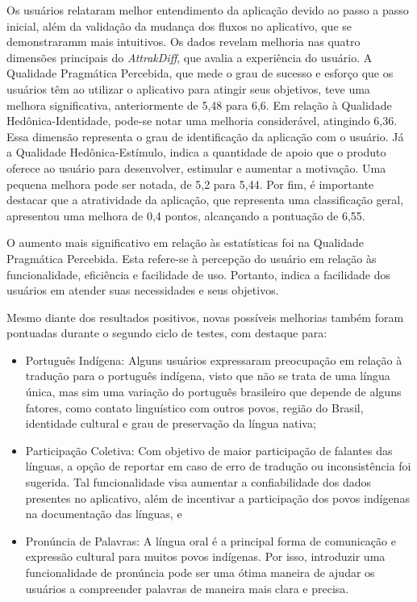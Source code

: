 Os usuários relataram melhor entendimento da aplicação devido ao passo a passo inicial, além da validação da mudança dos fluxos no aplicativo, que se demonstraramm mais intuitivos. Os dados revelam melhoria nas quatro dimensões principais do \textit{AttrakDiff}, 
que avalia a experiência do usuário. A Qualidade Pragmática Percebida, que mede o grau de sucesso e esforço que os usuários têm ao utilizar o aplicativo para atingir seus objetivos, teve uma melhora significativa, anteriormente de 5,48 para 6,6. Em relação à 
Qualidade Hedônica-Identidade, pode-se notar uma melhoria considerável, atingindo 6,36. Essa dimensão representa o grau de identificação da aplicação com o usuário. Já a Qualidade Hedônica-Estímulo, indica a quantidade de apoio que o produto oferece ao usuário 
para desenvolver, estimular e aumentar a motivação. Uma pequena melhora pode ser notada, de 5,2 para 5,44. Por fim, é importante destacar que a atratividade da aplicação, que representa uma classificação geral, apresentou uma melhora de 0,4 pontos, alcançando a 
pontuação de 6,55.

O aumento mais significativo em relação às estatísticas foi na Qualidade Pragmática Percebida. Esta refere-se à percepção do usuário em relação às funcionalidade, eficiência e facilidade de uso. Portanto, indica a facilidade dos usuários em atender suas necessidades e 
seus objetivos.

Mesmo diante dos resultados positivos, novas possíveis melhorias também foram pontuadas durante o segundo ciclo de testes, com destaque para:

\begin{itemize}
	\item Português Indígena: Alguns usuários expressaram preocupação em relação à tradução para o português indígena, visto que não se trata de uma língua única, mas sim uma variação do português brasileiro que depende de alguns fatores, como contato linguístico com outros 
	povos, região do Brasil, identidade cultural e grau de preservação da língua nativa;
	\item Participação Coletiva: Com objetivo de maior participação de falantes das línguas, a opção de reportar em caso de erro de tradução ou inconsistência foi sugerida. Tal funcionalidade visa aumentar a confiabilidade dos dados presentes no aplicativo, além de incentivar a 
	participação dos povos indígenas na documentação das línguas, e
	\item Pronúncia de Palavras: A língua oral é a principal forma de comunicação e expressão cultural para muitos povos indígenas. Por isso, introduzir uma funcionalidade de pronúncia pode ser uma ótima maneira de ajudar os usuários a compreender palavras de maneira mais clara 
	e precisa.
\end{itemize}

